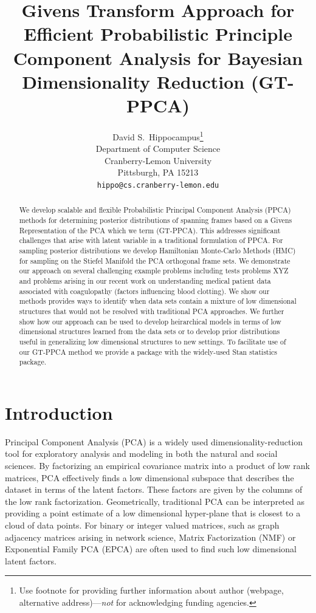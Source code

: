 \documentclass{article}
\title{Givens Transform Approach for Efficient Probabilistic Principle Component Analysis for Bayesian Dimensionality Reduction (GT-PPCA)}
\author{
  David S.~Hippocampus\thanks{Use footnote for providing further
    information about author (webpage, alternative
    address)---\emph{not} for acknowledging funding agencies.} \\
  Department of Computer Science\\
  Cranberry-Lemon University\\
  Pittsburgh, PA 15213 \\
  \texttt{hippo@cs.cranberry-lemon.edu} \\
}
\newcommand{\commentPJA}[1]{{\textcolor{commentPJA_color}{PJA: #1}}}
\begin{document}

\maketitle

\begin{abstract}
We develop scalable and flexible Probabilistic Principal Component Analysis (PPCA) methods for determining posterior distributions of spanning frames based on a Givens Representation of the PCA which we term (GT-PPCA).  This addresses significant challenges that arise with latent variable in a traditional formulation of PPCA.  For sampling posterior distributions we develop Hamiltonian Monte-Carlo Methods (HMC) for sampling on the Stiefel Manifold the PCA orthogonal frame sets.  We demonstrate our approach on several challenging example problems including tests problems XYZ and problems arising in  our recent work on understanding medical patient data associated with coagulopathy (factors influencing blood clotting).  We show our methods provides ways to identify when data sets contain a mixture of low dimensional structures that would not be resolved with traditional PCA approaches.  We further show how our approach can be used to develop heirarchical models in terms of low dimensional structures learned from the data sets or to develop prior distributions useful in generalizing low dimensional structures to new settings.  To facilitate use of our GT-PPCA method we provide a package with the widely-used Stan statistics package.  
\end{abstract}

\section{Introduction}


Principal Component Analysis (PCA) is a widely used dimensionality-reduction tool for exploratory analysis and modeling in both the natural and social sciences. By factorizing an empirical covariance matrix into a product of low rank matrices, PCA effectively finds a low dimensional subspace that describes the dataset in terms of the latent factors.  These factors are given by the columns of the low rank factorization.  Geometrically, traditional PCA can be interpreted as providing a point estimate of a low dimensional hyper-plane that is closest to a cloud of data points.  For binary or integer valued matrices, such as graph adjacency matrices arising in network science, Matrix Factorization (NMF) \citep{lee2001algorithms} or Exponential Family PCA (EPCA) \citep{collins2001generalization} are often used to find such low dimensional latent factors.
\end{document}
